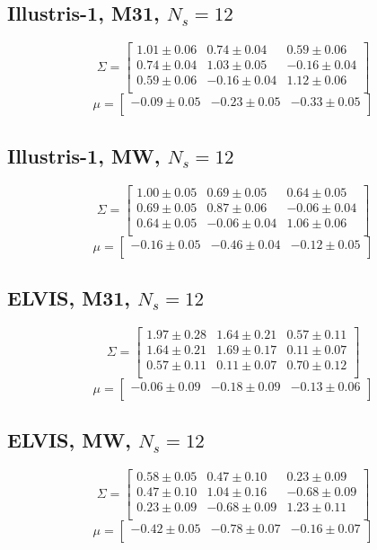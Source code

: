 \documentclass[a4paper,fleqn,usenatbib]{mnras}
\begin{document}
\subsection{Illustris-1, M31, $N_s=12$}
\[
\Sigma=
\begin{bmatrix}
1.01 \pm 0.06 & 0.74 \pm 0.04 & 0.59 \pm 0.06\\
0.74 \pm 0.04 & 1.03 \pm 0.05 & -0.16 \pm 0.04\\
0.59 \pm 0.06 & -0.16 \pm 0.04 & 1.12 \pm 0.06\\
\end{bmatrix}
\]
\[
\mu=
\begin{bmatrix}
-0.09 \pm 0.05 & -0.23 \pm 0.05 & -0.33 \pm 0.05\\
\end{bmatrix}
\]
\subsection{Illustris-1, MW, $N_s=12$}
\[
\Sigma=
\begin{bmatrix}
1.00 \pm 0.05 & 0.69 \pm 0.05 & 0.64 \pm 0.05\\
0.69 \pm 0.05 & 0.87 \pm 0.06 & -0.06 \pm 0.04\\
0.64 \pm 0.05 & -0.06 \pm 0.04 & 1.06 \pm 0.06\\
\end{bmatrix}
\]
\[
\mu=
\begin{bmatrix}
-0.16 \pm 0.05 & -0.46 \pm 0.04 & -0.12 \pm 0.05\\
\end{bmatrix}
\]

\subsection{ELVIS, M31, $N_s=12$}
\[
\Sigma=
\begin{bmatrix}
1.97 \pm 0.28 & 1.64 \pm 0.21 & 0.57 \pm 0.11\\
1.64 \pm 0.21 & 1.69 \pm 0.17 & 0.11 \pm 0.07\\
0.57 \pm 0.11 & 0.11 \pm 0.07 & 0.70 \pm 0.12\\
\end{bmatrix}
\]
\[
\mu=
\begin{bmatrix}
-0.06 \pm 0.09 & -0.18 \pm 0.09 & -0.13 \pm 0.06\\
\end{bmatrix}
\]
\subsection{ELVIS, MW, $N_s=12$}
\[
\Sigma=
\begin{bmatrix}
0.58 \pm 0.05 & 0.47 \pm 0.10 & 0.23 \pm 0.09\\
0.47 \pm 0.10 & 1.04 \pm 0.16 & -0.68 \pm 0.09\\
0.23 \pm 0.09 & -0.68 \pm 0.09 & 1.23 \pm 0.11\\
\end{bmatrix}
\]
\[
\mu=
\begin{bmatrix}
-0.42 \pm 0.05 & -0.78 \pm 0.07 & -0.16 \pm 0.07\\
\end{bmatrix}
\]
\end{document}
